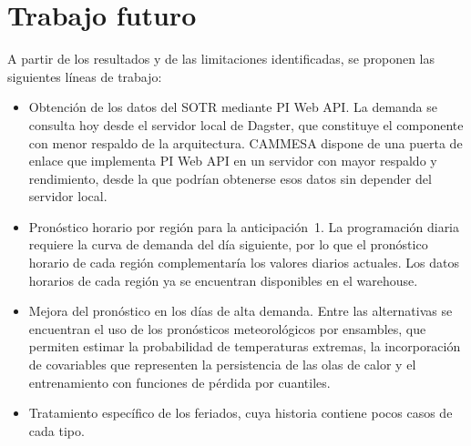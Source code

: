 \section{Trabajo futuro}
\label{sec:trabajo_futuro}

A partir de los resultados y de las limitaciones identificadas, se proponen las siguientes líneas de trabajo:

\begin{itemize}
	\item Obtención de los datos del SOTR mediante PI Web API. La demanda se consulta hoy desde el servidor local de Dagster, que constituye el componente con menor respaldo de la arquitectura. CAMMESA dispone de una puerta de enlace que implementa PI Web API en un servidor con mayor respaldo y rendimiento, desde la que podrían obtenerse esos datos sin depender del servidor local.
	\item Pronóstico horario por región para la anticipación~1. La programación diaria requiere la curva de demanda del día siguiente, por lo que el pronóstico horario de cada región complementaría los valores diarios actuales. Los datos horarios de cada región ya se encuentran disponibles en el warehouse.
	\item Mejora del pronóstico en los días de alta demanda. Entre las alternativas se encuentran el uso de los pronósticos meteorológicos por ensambles, que permiten estimar la probabilidad de temperaturas extremas, la incorporación de covariables que representen la persistencia de las olas de calor y el entrenamiento con funciones de pérdida por cuantiles. 
	\item Tratamiento específico de los feriados, cuya historia contiene pocos casos de cada tipo.
\end{itemize}
